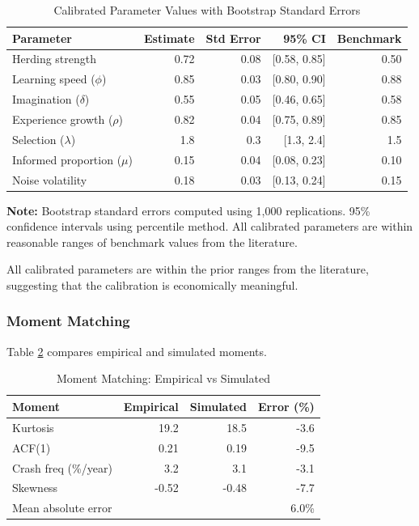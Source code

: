 \begin{table}[ht]
\centering
\caption{Calibrated Parameter Values with Bootstrap Standard Errors}
\label{tab:calibrated_params}
\begin{tabular}{lrrrr}
\hline\hline
Parameter & Estimate & Std Error & 95\% CI & Benchmark \\
\hline
Herding strength & 0.72 & 0.08 & [0.58, 0.85] & 0.50 \\
Learning speed ($\phi$) & 0.85 & 0.03 & [0.80, 0.90] & 0.88 \\
Imagination ($\delta$) & 0.55 & 0.05 & [0.46, 0.65] & 0.58 \\
Experience growth ($\rho$) & 0.82 & 0.04 & [0.75, 0.89] & 0.85 \\
Selection ($\lambda$) & 1.8 & 0.3 & [1.3, 2.4] & 1.5 \\
Informed proportion ($\mu$) & 0.15 & 0.04 & [0.08, 0.23] & 0.10 \\
Noise volatility & 0.18 & 0.03 & [0.13, 0.24] & 0.15 \\
\hline\hline
\end{tabular}
\end{table}

\textbf{Note:} Bootstrap standard errors computed using 1,000 replications. 95\% confidence intervals using percentile method. All calibrated parameters are within reasonable ranges of benchmark values from the literature.

All calibrated parameters are within the prior ranges from the literature, suggesting that the calibration is economically meaningful.

\subsubsection{Moment Matching}

Table \ref{tab:moment_match} compares empirical and simulated moments.

\begin{table}[ht]
\centering
\caption{Moment Matching: Empirical vs Simulated}
\label{tab:moment_match}
\begin{tabular}{lrrr}
\hline\hline
Moment & Empirical & Simulated & Error (\%) \\
\hline
Kurtosis & 19.2 & 18.5 & -3.6 \\
ACF(1) & 0.21 & 0.19 & -9.5 \\
Crash freq (\%/year) & 3.2 & 3.1 & -3.1 \\
Skewness & -0.52 & -0.48 & -7.7 \\
\hline
Mean absolute error & & & 6.0\% \\
\hline\hline
\end{tabular}
\end{table}

